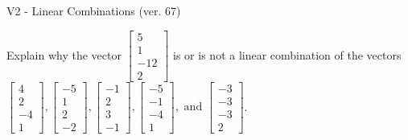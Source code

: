 \begin{exercise}
  \begin{exerciseTitle}V2 - Linear Combinations (ver. 67)\end{exerciseTitle}
  \begin{exerciseStatement}
    Explain why the vector \(\left[\begin{array}{c}
5 \\
1 \\
-12 \\
2
\end{array}\right]\)  is or is not a linear 
	combination of the vectors \(\left[\begin{array}{c}
4 \\
2 \\
-4 \\
1
\end{array}\right] , \left[\begin{array}{c}
-5 \\
1 \\
2 \\
-2
\end{array}\right] , \left[\begin{array}{c}
-1 \\
2 \\
3 \\
-1
\end{array}\right] , \left[\begin{array}{c}
-5 \\
-1 \\
-4 \\
1
\end{array}\right] , \text{ and } \left[\begin{array}{c}
-3 \\
-3 \\
-3 \\
2
\end{array}\right]\).
	



\end{exerciseStatement}
\end{exercise}
